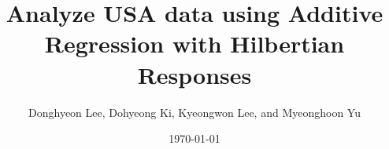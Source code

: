 \documentclass{scrartcl}
\begin{document}
\title{Analyze USA data using Additive Regression with Hilbertian Responses}
\author{Donghyeon Lee, Dohyeong Ki, Kyeongwon Lee, and Myeonghoon Yu}
\date{\today}
\maketitle








\end{document}
